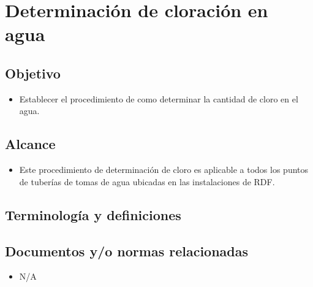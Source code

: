 \renewcommand{\MenorVer}{0}
\renewcommand{\MayorVer}{2}
\renewcommand{\Codigo}{HYS-21-IT}
\renewcommand{\FechaPub}{2023--01}
\renewcommand{\Titulo}{Determinación de cloración en agua}

\section{\Titulo}

\subsection{Objetivo}

\begin{itemize}
	\item Establecer el procedimiento de como determinar la cantidad de cloro en el agua.
\end{itemize}

\subsection{Alcance}

\begin{itemize}
	\item Este procedimiento de determinación de cloro es aplicable a todos los puntos de tuberías de tomas de agua ubicadas en las instalaciones de \gls{RDF}.
\end{itemize}

\subsection{Terminología y definiciones}

\begin{description}
\end{description}

\subsection{Documentos y/o normas relacionadas}

\begin{itemize}
	\item N/A
\end{itemize}

